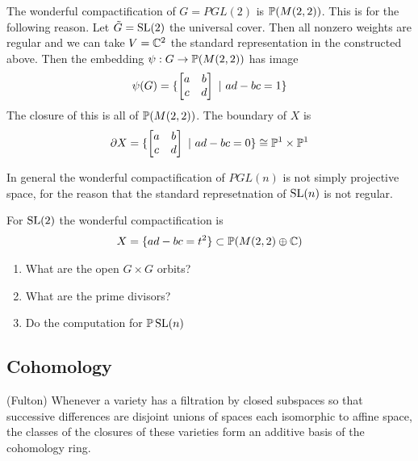\documentclass[12pt]{article}
\begin{document}
\begin{example}
    The wonderful compactification of $G = PGL(2)$ is $\P(M(2,2))$. This is for the following reason. Let $\tilde G = \SL(2)$ the universal cover.
    Then all nonzero weights are regular and we can take $V = \C^2$ the standard representation in the constructed above. Then the embedding $\psi:G\to\P(M(2,2))$
    has image \begin{align*}
        \psi(G) = \set{\begin{bmatrix}
            a & b \\
            c & d
            \end{bmatrix}\st ad - bc = 1
        }
    \end{align*}
    The closure of this is all of $\P(M(2,2))$. The boundary of $X$ is \begin{align*}
        \partial X = \set{\begin{bmatrix}
            a & b \\
            c & d
            \end{bmatrix}\st ad - bc = 0} \cong \P^1\times \P^1
    \end{align*}
\end{example}
\begin{remark}
    In general the wonderful compactification of $PGL(n)$ is not simply projective space, for the reason that the standard represetnation of $\SL(n)$ is not regular.
\end{remark}

\begin{example}
    For $\SL(2)$ the wonderful compactification is \begin{align*}
        X = \set{ad-bc = t^2}\subset \P(M(2,2)\oplus \C)
    \end{align*}
\end{example}

\begin{remark}
    \begin{enumerate}
        \item What are the open $G\times G$ orbits?
        \item What are the prime divisors?
        \item Do the computation for $\P\SL(n)$
    \end{enumerate}
\end{remark}
\subsection{Cohomology}
(Fulton) Whenever a variety has a filtration by closed subspaces so that successive differences are disjoint unions of spaces each isomorphic to affine space, the classes of the closures of these varieties
form an additive basis of the cohomology ring. 
\end{document}
